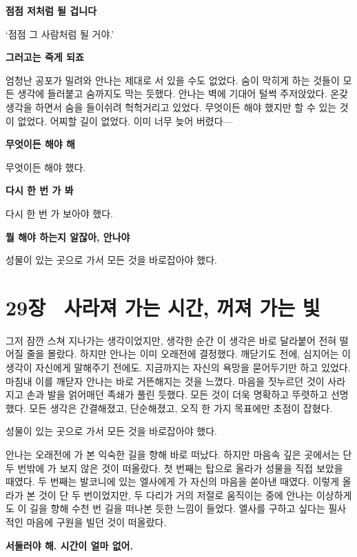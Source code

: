 \textbf{점점 저처럼 될 겁니다}

`점점 그 사람처럼 될 거야.'

\textbf{그러고는 죽게 되죠}

엄청난 공포가 밀려와 안나는 제대로 서 있을 수도 없었다. 숨이 막히게 하는 것들이 모든 생각에 들러붙고 숨까지도 막는 듯했다. 안나는 벽에 기대어 털썩 주저앉았다. 온갖 생각을 하면서 숨을 들이쉬려 헉헉거리고 있었다. 무엇이든 해야 했지만 할 수 있는 것이 없었다. 어찌할 길이 없었다. 이미 너무 늦어 버렸다—

\textbf{무엇이든 해야 해}

무엇이든 해야 했다.

\textbf{다시 한 번 가 봐}

다시 한 번 가 보아야 했다.

\textbf{뭘 해야 하는지 알잖아, 안나야}

성물이 있는 곳으로 가서 모든 것을 바로잡아야 했다.



\chapter[29장  사라져 가는 시간, 꺼져 가는 빛][29장\hspace*{.5em}사라져 가는 시간, 꺼져 가는 빛]{29장 \ 사라져 가는 시간, 꺼져 가는 빛}



그저 잠깐 스쳐 지나가는 생각이었지만, 생각한 순간 이 생각은 바로 달라붙어 전혀 떨어질 줄을 몰랐다. 하지만 안나는 이미 오래전에 결정했다. 깨닫기도 전에, 심지어는 이 생각이 자신에게 말해주기 전에도. 지금까지는 자신의 욕망을 묻어두기만 하고 있었다. 마침내 이를 깨닫자 안나는 바로 거뜬해지는 것을 느꼈다. 마음을 짓누르던 것이 사라지고 손과 발을 얽어매던 족쇄가 풀린 듯했다. 모든 것이 더욱 명확하고 뚜렷하고 선명했다. 모든 생각은 간결해졌고, 단순해졌고, 오직 한 가지 목표에만 초점이 잡혔다.

성물이 있는 곳으로 가서 모든 것을 바로잡아야 했다.

안나는 오래전에 가 본 익숙한 길을 향해 바로 떠났다. 하지만 마음속 깊은 곳에서는 단 두 번밖에 가 보지 않은 것이 떠올랐다. 첫 번째는 탑으로 올라가 성물을 직접 보았을 때였다. 두 번째는 발코니에 있는 엘사에게 가 자신의 마음을 쏟아낸 때였다. 이렇게 올라가 본 것이 단 두 번이었지만, 두 다리가 거의 저절로 움직이는 중에 안나는 이상하게도 이 길을 향해 수천 번 길을 떠나본 듯한 느낌이 들었다. 엘사를 구하고 싶다는 필사적인 마음에 구원을 빌던 것이 떠올랐다.

\textbf{서둘러야 해. 시간이 얼마 없어.}

